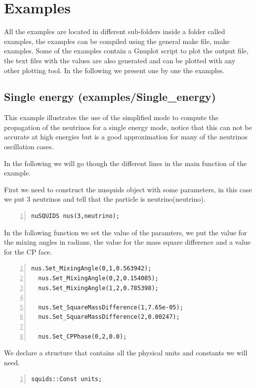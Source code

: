 

\section{Examples}
\label{sec:examples} 
All the examples are located in different sub-folders inside a folder
called {\ttf examples}, the examples can be compiled using the
general make file, {\ttf make examples}.
Some of the examples contain a Gnuplot script to plot the output file,
the text files with the values are also generated and can be plotted
with any other plotting tool.
In the following we present one by one the examples.

\subsection{Single energy \textnormal{({\ttf examples/Single\_energy})}}
\label{sec:single}
This example illustrates the use of the simplified mode to compute the
propagation of the neutrinos for a single energy mode, notice that
this can not be accurate at high energies but is a good approximation
for many of the neutrinos oscillation cases.

In the following we will go though the different lines in the main
function of the example.

First we need to construct the nusquids object with some parameters,
in this case we put 3 neutrinos and tell that the particle is
neutrino({\ttf neutrino}).
\begin{lstlisting}[frame=leftline, numbers = left,breaklines=true, label = ex:sin1]
  nuSQUIDS nus(3,neutrino);
\end{lstlisting}

In the following function we set the value of the paramters, we put
the value for the mixing angles in radians, the value for the mass
square difference and a value for the CP face.
 
\begin{lstlisting}[frame=leftline, numbers = left,breaklines=true, label = ex:sin1,firstnumber=last]
  nus.Set_MixingAngle(0,1,0.563942);
  nus.Set_MixingAngle(0,2,0.154085);
  nus.Set_MixingAngle(1,2,0.785398);

  nus.Set_SquareMassDifference(1,7.65e-05);
  nus.Set_SquareMassDifference(2,0.00247);

  nus.Set_CPPhase(0,2,0.0);
\end{lstlisting}

We declare  a structure that contains all the physical units and
constants we will need. 
\begin{lstlisting}[frame=leftline, numbers = left,breaklines=true, label = ex:sin1,firstnumber=last]
  squids::Const units;
\end{lstlisting}

